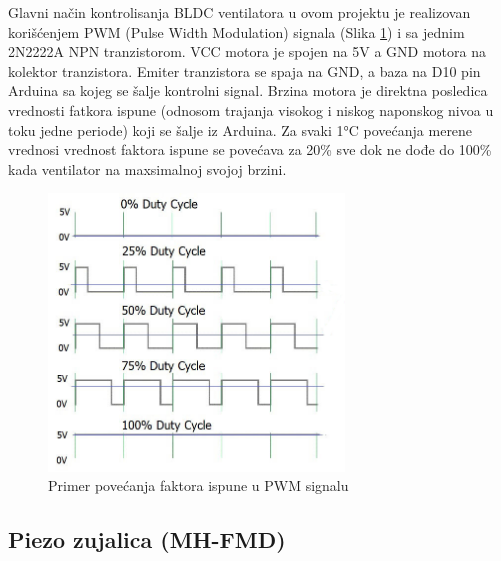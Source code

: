 \documentclass[a4paper, 12pt]{article}
\begin{document}
\vspace{10pt}

Glavni način kontrolisanja BLDC ventilatora u ovom projektu je realizovan korišćenjem  PWM (Pulse Width Modulation) signala (Slika \ref{fig:pwm}) i sa jednim 2N2222A NPN tranzistorom. VCC motora je spojen na 5V a GND motora na kolektor tranzistora. Emiter tranzistora se spaja na GND, a baza na D10 pin Arduina sa kojeg se šalje kontrolni signal. Brzina motora je direktna posledica vrednosti fatkora ispune (odnosom trajanja visokog i niskog naponskog nivoa u toku jedne periode) koji se šalje iz Arduina. Za svaki 1°C povećanja merene vrednosi vrednost faktora ispune se povećava za 20\% sve dok ne dođe do 100\% kada ventilator na maxsimalnoj svojoj brzini. 

\vspace{10pt}

\begin{figure}[H]
\centering
	\includegraphics[width=0.7\textwidth]{images/pwm}
	\caption{Primer povećanja faktora ispune u PWM signalu} \label{fig:pwm}
\end{figure}
\pagebreak

	\subsection{Piezo zujalica (MH-FMD)}
	
\end{document}
